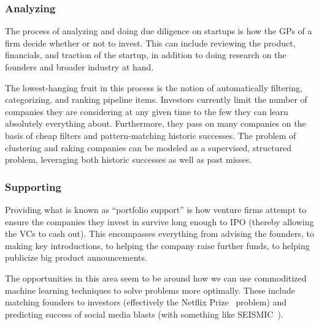 \subsubsection{Analyzing}

The process of analyzing and doing due diligence on startups is how the GPs of a firm decide whether or not to invest. This can include reviewing the product, financials, and traction of the startup, in addition to doing research on the founders and broader industry at hand.

The lowest-hanging fruit in this process is the notion of automatically filtering, categorizing, and ranking pipeline items. Investors currently limit the number of companies they are considering at any given time to the few they can learn absolutely everything about. Furthermore, they pass on many companies on the basis of cheap filters and pattern-matching historic successes. The problem of clustering and raking companies can be modeled as a supervised, structured problem, leveraging both historic successes as well as past misses.

\subsubsection{Supporting}

Providing what is known as ``portfolio support'' is how venture firms attempt to ensure the companies they invest in survive long enough to IPO (thereby allowing the VCs to cash out). This encompasses everything from advising the founders, to making key introductions, to helping the company raise further funds, to helping publicize big product announcements.

The opportunities in this area seem to be around how we can use commoditized machine learning techniques to solve problems more optimally. These include matching founders to investors (effectively the Netflix Prize~\cite{netflixpize} problem) and predicting success of social media blasts (with something like SEISMIC~\cite{seismic}).
